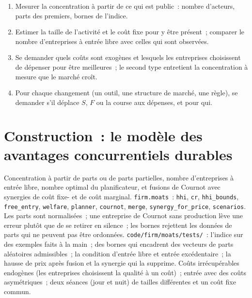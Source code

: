 \begin{method}\label{met:fm:competition-and-the-future:read}
\begin{enumerate}
\item Mesurer la concentration à partir de ce qui est public~: nombre d'acteurs, parts des premiers, bornes de l'indice.
\item Estimer la taille de l'activité et le coût fixe pour y être présent~; comparer le nombre d'entreprises à entrée libre avec celles qui sont observées.
\item Se demander quels coûts sont exogènes et lesquels les entreprises choisissent de dépenser pour être meilleures~; le second type entretient la concentration à mesure que le marché croît.
\item Pour chaque changement (un outil, une structure de marché, une règle), se demander s'il déplace $S$, $F$ ou la course aux dépenses, et pour qui.
\end{enumerate}
\end{method}

\section{Construction~: le modèle des avantages concurrentiels durables}\label{bld:fm:competition-and-the-future:moats}

\begin{build}
 Concentration à partir de parts ou de parts partielles, nombre d'entreprises à entrée libre, nombre optimal du planificateur, et fusions de Cournot avec synergies de coût fixe-
et de coût marginal.
 \texttt{firm.moats}~: \texttt{hhi}, \texttt{cr}, \texttt{hhi\_bounds}, \texttt{free\_entry}, \texttt{welfare}, \texttt{planner},
\texttt{cournot}, \texttt{merge}, \texttt{synergy\_for\_price}, \texttt{scenarios}.
 Les parts sont normalisées~; une entreprise de Cournot sans production lève une erreur plutôt que de se retirer en silence~; les bornes rejettent les données de parts
qui ne peuvent pas être ordonnées.
 \texttt{code/firm/moats/tests/}~: l'indice sur des exemples faits à la main~; des bornes qui encadrent des vecteurs de parts aléatoires admissibles~; la
condition d'entrée libre et entrée excédentaire~; la hausse de prix après fusion et la synergie qui la supprime.
 Coûts irrécupérables endogènes (les entreprises choisissent la qualité à un coût)~; entrée avec des coûts asymétriques~; deux séances (jour et nuit) de
tailles différentes et un coût fixe commun.
\end{build}

